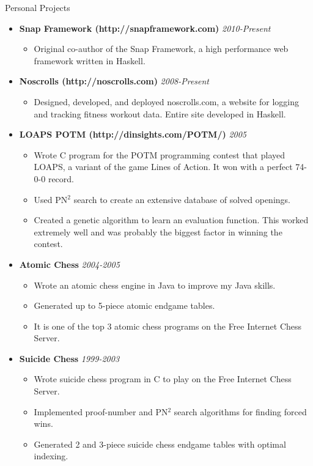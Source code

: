 \documentclass[11pt,oneside]{article}
\newenvironment{ressection}[1]{
	\vspace{4pt}
	{\fontfamily{phv}\selectfont\Large#1}
	\begin{itemize}
	\vspace{3pt}
}{
	\end{itemize}
}
\newcommand{\ressubitem}[1]{
	\vspace{-1pt}
	\item \begin{flushleft} #1 \end{flushleft}
}
\newcommand{\resbigitemb}[2]{
	\vspace{-5pt}
	\item{\textbf{#1} \hfill \textit{#2}}
}
\newenvironment{resdateditem}[2]{
	\resbigitemb{#1}{#2}
	\vspace{-2pt}
	\begin{itemize}
}{
	\end{itemize}
}
\begin{document}
\begin{ressection}{Personal Projects}

  \begin{resdateditem}{Snap Framework (http://snapframework.com)}{2010-Present}
    \ressubitem{Original co-author of the Snap Framework, a high performance
web framework written in Haskell.}
  \end{resdateditem}

\pagebreak

  \begin{resdateditem}{Noscrolls (http://noscrolls.com)}{2008-Present}
    \ressubitem{Designed, developed, and deployed noscrolls.com, a
website for logging and tracking fitness workout data.  Entire site
developed in Haskell.}
  \end{resdateditem}

  \begin{resdateditem}{LOAPS POTM (http://dinsights.com/POTM/)}{2005}

    \ressubitem{Wrote C program for the POTM programming contest that
    played LOAPS, a variant of the game Lines of Action.  It won with
    a perfect 74-0-0 record.}

    \ressubitem{Used PN$^2$ search to create an extensive database of
    solved openings.}

    \ressubitem{Created a genetic algorithm to learn an evaluation
    function.  This worked extremely well and was probably the biggest
    factor in winning the contest.}

  \end{resdateditem}

  \begin{resdateditem}{Atomic Chess}{2004-2005}
    \ressubitem{Wrote an atomic chess engine in Java to improve my Java skills.}
    \ressubitem{Generated up to 5-piece atomic endgame tables.}
    \ressubitem{It is one of the top 3 atomic chess programs on the Free Internet Chess Server.}
  \end{resdateditem}

  \begin{resdateditem}{Suicide Chess}{1999-2003}
    \ressubitem{Wrote suicide chess program in C to play on the Free Internet Chess Server.}
    \ressubitem{Implemented proof-number and PN$^2$ search algorithms for finding forced wins.}
    \ressubitem{Generated 2 and 3-piece suicide chess endgame tables with optimal indexing.}
  \end{resdateditem}
\end{ressection}
\end{document}
